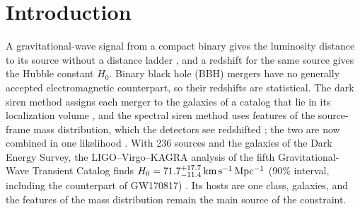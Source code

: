 \documentclass[aps,prd,reprint,twocolumn,superscriptaddress,nofootinbib,floatfix,nolongbibliography]{revtex4-2}
\newcommand{\kms}{{\rm km\,s^{-1}\,Mpc^{-1}}}
\newcommand{\fagn}{f_{\rm AGN}}
\begin{document}
\begin{abstract}
credible interval of $H_0$ falls from \HWUnknownZero{} to
$\HWUnknownHundred\,\kms$ as the mergers hosted by AGN go from none to all
(means over \NrealClasses{} realizations), and with three in ten hosted by
AGN the analysis needs \CostUnknownThirty{} times as many mergers as it would
if the host class of each were known, for a half-width that falls as the
inverse square root of their number.
Under the same assumptions the inputs of $H_0$ and $\fagn$ lie inside the
90\% credible intervals of the posterior combined over \NrealKnown{}
realizations, and mergers with no AGN hosts give
$\fagn<\CtrlZerofAGNCombUL$.
A dark siren measurement from more than one kind of host has to infer where
the mergers are and what they are together. %
\end{abstract}

\maketitle

\section{Introduction}
\label{sec:intro}

A gravitational-wave signal from a compact binary gives the luminosity
distance to its source without a distance ladder \cite{Schutz:1986gp}, and
a redshift for the same source gives
the Hubble constant $H_0$. Binary black hole (BBH) mergers have no generally
accepted electromagnetic counterpart, so their redshifts are statistical. The
dark siren method assigns each merger to the galaxies of a catalog that lie
in its localization volume
\cite{Schutz:1986gp,Gray:2019ksv,Gair:2022zsa},
and the spectral siren method uses features of the source-frame mass
distribution, which the detectors see redshifted
\cite{Farr:2019twy,Ezquiaga:2022zkx,Mastrogiovanni:2021wsd};
the two are now combined in one likelihood
\cite{Mastrogiovanni:2023emh,Gray:2023wgj}. With 236 sources
and the galaxies of the Dark Energy Survey, the LIGO--Virgo--KAGRA analysis
of the fifth Gravitational-Wave Transient Catalog finds
$H_0=71.7^{+17.7}_{-11.4}\,\kms$ (90\% interval, including the counterpart of
GW170817) \cite{LIGOScientific:2026uyd}. Its hosts are one class, galaxies,
and the features of the mass distribution remain the main source of the
constraint.
\end{document}
